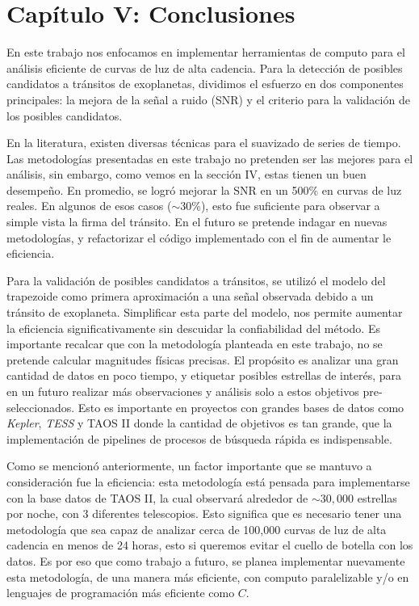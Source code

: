 \chapter*{\textbf{Capítulo V: Conclusiones}}
\setcounter{chapter}{5}
\setcounter{equation}{0}
\setcounter{figure}{0}
\setcounter{table}{0}

En este trabajo nos enfocamos en implementar herramientas de computo para el análisis eficiente de curvas de luz de alta cadencia. Para la detección de posibles candidatos a tránsitos de exoplanetas, dividimos el esfuerzo en dos componentes principales: la mejora de la señal a ruido (SNR) y el criterio para la validación de los posibles candidatos.


En la literatura, existen diversas técnicas para el suavizado de series de tiempo. Las metodologías presentadas en este trabajo no pretenden ser las mejores para el análisis, sin embargo, como vemos en la sección IV, estas tienen un buen desempeño. En promedio, se logró mejorar la SNR en un 500\% en curvas de luz reales. En algunos de esos casos ($\sim 30$\%), esto fue suficiente para observar a simple vista la firma del tránsito. En el futuro se pretende indagar en nuevas metodologías, y refactorizar el código implementado con el fin de aumentar le eficiencia.

Para la validación de posibles candidatos a tránsitos, se utilizó el modelo del trapezoide como primera aproximación a una señal observada debido a un tránsito de exoplaneta. Simplificar esta parte del modelo, nos permite aumentar la eficiencia significativamente sin descuidar la confiabilidad del método. Es importante recalcar que con la metodología planteada en este trabajo, no se pretende calcular magnitudes físicas precisas. El propósito es analizar una gran cantidad de datos en poco tiempo, y etiquetar posibles estrellas de interés, para en un futuro realizar más observaciones y análisis solo a estos objetivos pre-seleccionados. Esto es importante en proyectos con grandes bases de datos como \textit{Kepler}, \textit{TESS} y TAOS II donde la cantidad de objetivos es tan grande, que la implementación de pipelines de procesos de búsqueda rápida es indispensable.


Como se mencionó anteriormente, un factor importante que se mantuvo a consideración fue la eficiencia: esta metodología está pensada para implementarse con la base datos de TAOS II, la cual observará alrededor de $\sim 30,000$ estrellas por noche, con 3 diferentes telescopios. Esto significa que es necesario tener una metodología que sea capaz de analizar cerca de 100,000 curvas de luz de alta cadencia en menos de 24 horas, esto si queremos evitar el cuello de botella con los datos. Es por eso que como trabajo a futuro, se planea implementar nuevamente esta metodología, de una manera más eficiente, con computo paralelizable y/o en lenguajes de programación más eficiente como $C$.

